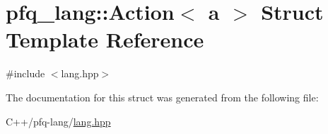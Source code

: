 \hypertarget{structpfq__lang_1_1Action}{\section{pfq\+\_\+lang\+:\+:Action$<$ a $>$ Struct Template Reference}
\label{structpfq__lang_1_1Action}
}


{\ttfamily \#include $<$lang.\+hpp$>$}



The documentation for this struct was generated from the following file\+:\begin{DoxyCompactItemize}
\item 
C++/pfq-\/lang/\hyperlink{lang_8hpp}{lang.\+hpp}\end{DoxyCompactItemize}

